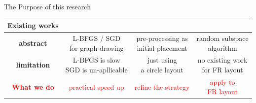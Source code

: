 \documentclass[13pt,aspectratio=169,table,dvipdfmx]{beamer}
\newif\ifShowHidden
\begin{document}
\begin{frame}{The Purpose of this research}
    \begin{table}
        \centering
        \begin{tabular}{c|c|c|c}
            \toprule
            Existing works                       & \makecell[c]{\cite{6183577}                                                                                         \\\cite{8419285}}    & \cite{ghassemitoosiSimulatedAnnealingPreProcessing2016} & \cite{NEURIPS2019_bc6dc48b}           \\
            \midrule
            \textbf{abstract}                    & \makecell[c]{L-BFGS / SGD                                                                                           \\for graph drawing} & \makecell[c]{pre-processing as\\initial placement}                     & \makecell[c]{random subspace\\algorithm}             \\[1.5em]
            \textbf{limitation}                  & \makecell[c]{L-BFGS is slow                                                                                         \\SGD is un-apllicable} & \makecell[c]{just using\\a circle layout}                     & \makecell[c]{no existing work\\for FR layout}             \\
            \midrule
            \textcolor{red}{\textbf{What we do}} & \textcolor{red}{practical speed up} & \textcolor{red}{refine the strategy} & \makecell[c]{\textcolor{red}{apply to} \\\textcolor{red}{FR layout}} \\
            \bottomrule
        \end{tabular}
    \end{table}
\end{frame}
\end{document}
